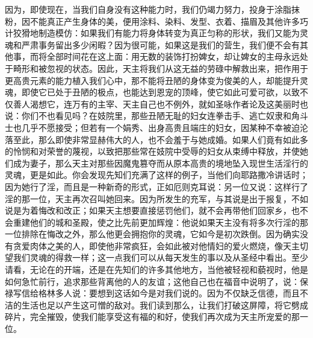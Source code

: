 因为，即使现在，当我们自身没有这种能力时，我们仍竭力努力，投身于涂脂抹粉，因不能真正产生身体的美，便用涂料、染料、发型、衣着、描眉及其他许多巧计狡猾地制造模仿：如果我们有能力将身体转变为真正匀称的形状，我们又能为灵魂和严肃事务留出多少闲暇？因为很可能，如果这是我们的营生，我们便不会有其他事，而将全部时间花在这上面：用无数的装饰打扮婢女，却让婢女的主母永远处于畸形和被忽视的状态。因此，天主将我们从这无益的劳碌中解救出来，把作用于更高贵元素的能力植入我们心中，那不能将丑陋的身体变为俊美的人，却能提升灵魂，即使它已处于丑陋的极点，也能达到恩宠的顶峰，使它如此可爱可欲，以致不仅善人渴想它，连万有的主宰、天主自己也不例外，就如圣咏作者论及这美丽时也说：你们不也看见吗？在妓院里，那些丑陋无耻的妇女连拳击手、逃亡奴隶和角斗士也几乎不愿接受；但若有一个娟秀、出身高贵且端庄的妇女，因某种不幸被迫沦落至此，那么即使非常显赫伟大的人，也不会羞于与她成婚。如果人们竟有如此多的怜悯和对荣誉的蔑视，以致把那些常在妓院中受辱的妇女从束缚中释放，并使她们成为妻子，那么天主对那些因魔鬼篡夺而从原本高贵的境地坠入现世生活淫行的灵魂，更是如此。你会发现先知们充满了这样的例子，当他们向耶路撒冷讲话时；因为她行了淫，而且是一种新奇的形式，正如厄则克耳说：另一位又说：这样行了淫的那一位，天主再次召叫她回来。因为所发生的充军，与其说是出于报复，不如说是为着悔改和改正；如果天主想要直接惩罚他们，就不会再带他们回家乡，也不会重建他们的城和圣殿，使之比先前更加辉煌：他说如果天主没有将多次行淫的那一位排除在悔改之外，那么他更会拥抱你的灵魂，它如今是初次跌倒。因为确实没有贪爱肉体之美的人，即使他非常疯狂，会如此被对他情妇的爱火燃烧，像天主切望我们灵魂的得救一样；这一点我们可以从每天发生的事以及从圣经中看出。至少请看，无论在的开端，还是在先知们的许多其他地方，当他被轻视和藐视时，他是如何急忙前行，追求那些背离他的人的友谊；这他自己也在福音中说明了，说：保禄写信给格林多人说：要想到这话如今是对我们说的。因为不仅缺乏信德，而且不洁的生活也足以产生这可憎的敌对。我们读到那么，让我们打破这屏障，将它劈成碎片，完全摧毁，使我们能享受这有福的和好，使我们再次成为天主所宠爱的那一位。\par

